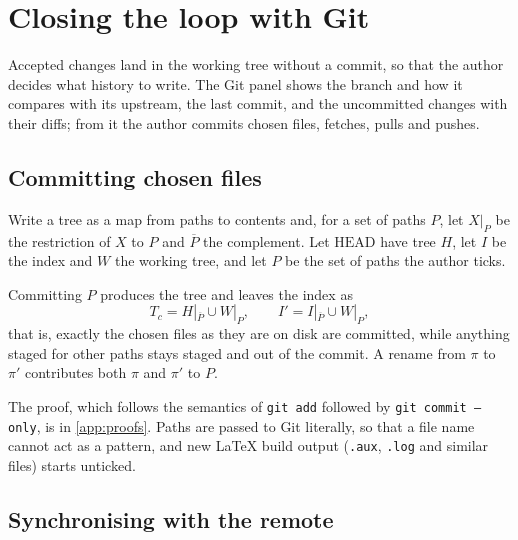 \section{Closing the loop with Git}
\label{sec:git}

Accepted changes land in the working tree without a commit, so that the author
decides what history to write. The Git panel shows the branch and how it
compares with its upstream, the last commit, and the uncommitted changes with
their diffs; from it the author commits chosen files, fetches, pulls and
pushes.

\subsection{Committing chosen files}

Write a tree as a map from paths to contents and, for a set of paths $P$, let
$X|_P$ be the restriction of $X$ to $P$ and $\overline{P}$ the complement. Let
$\mathrm{HEAD}$ have tree $H$, let $I$ be the index and $W$ the working tree,
and let $P$ be the set of paths the author ticks.

\begin{proposition}
\label{prop:partial}
Committing $P$ produces the tree and leaves the index as
\begin{equation}
  T_{c} = H|_{\overline{P}} \cup W|_{P},
  \qquad
  I' = I|_{\overline{P}} \cup W|_{P},
  \label{eq:partial}
\end{equation}
that is, exactly the chosen files as they are on disk are committed, while
anything staged for other paths stays staged and out of the commit. A rename
from $\pi$ to $\pi'$ contributes both $\pi$ and $\pi'$ to $P$.
\end{proposition}

The proof, which follows the semantics of \texttt{git add} followed by
\texttt{git commit --only}, is in \cref{app:proofs}. Paths are passed to Git
literally, so that a file name cannot act as a pattern, and new \LaTeX{} build
output (\texttt{.aux}, \texttt{.log} and similar files) starts unticked.

\subsection{Synchronising with the remote}

